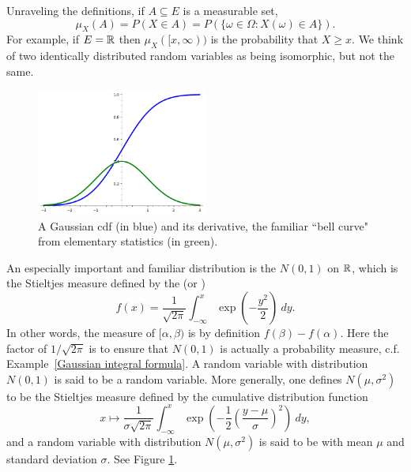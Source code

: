 \begin{subsec}
Unraveling the definitions, if $A \subseteq E$ is a measurable set,
\[\mu_{X}(A) = P(X \in A) = P(\{\omega \in \Omega: X(\omega) \in A\}).\]
For example, if $E = \mathbb{R}$ then $\mu_{X}([x, \infty))$ is the probability that $X \geq x$.
We think of two identically distributed random variables as being isomorphic, but not the same.
\end{subsec}

\begin{figure}
\label{bell curve figure}
\caption{A Gaussian cdf (in blue) and its derivative, the familiar ``bell curve" from elementary statistics (in green).}
\centering \includegraphics[width=0.5\textwidth]{graphics/bell_curve}
\end{figure}

\begin{example}
\label{Gaussian CDF}
An especially important and familiar distribution is the  $N(0, 1)$ on $\mathbb{R}$, which is the Stieltjes measure defined by the  (or )
\[f(x) = \frac{1}{\sqrt{2\pi}} \int_{-\infty}^{x} \exp\left(-\frac{y^{2}}{2}\right) ~dy.\]
In other words, the measure of $[\alpha, \beta)$ is by definition $f(\beta) - f(\alpha)$.
Here the factor of $1/\sqrt{2\pi}$ is to ensure that $N(0, 1)$ is actually a probability measure, c.f. Example~\ref{Gaussian integral formula}.
A random variable with distribution $N(0, 1)$ is said to be a  random variable. More generally, one defines $N(\mu, \sigma^{2})$ to be the Stieltjes measure defined by the cumulative distribution function
\[x \mapsto \frac{1}{\sigma\sqrt{2\pi}} \int_{-\infty}^{x} \exp\left(-\frac{1}{2}{\left(\frac{y - \mu}{\sigma}\right)}^{2}\right) ~dy,\]
and a random variable with distribution $N(\mu, \sigma^{2})$ is said to be  with mean $\mu$ and standard deviation $\sigma$.
See Figure \ref{bell curve figure}.
\end{example}

